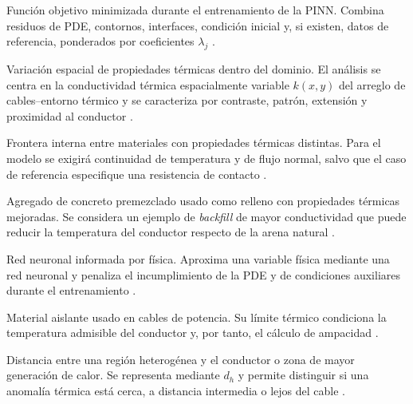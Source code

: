\documentclass[11pt,a4paper,oneside]{report}
\newcommand{\kx}{k(x,y)}
\begin{document}
\begin{description}[style=nextline,itemsep=0.5\baselineskip,parsep=0pt,topsep=0.25\baselineskip]
  \item[Función de pérdida.] Función objetivo minimizada durante el entrenamiento de la PINN. Combina residuos de PDE, contornos, interfaces, condición inicial y, si existen, datos de referencia, ponderados por coeficientes $\lambda_j$ \parencites[686--690]{raissi2019}[16]{pan2025}[1--2,17]{lawal2022}.

\item[Heterogeneidad térmica.] Variación espacial de propiedades térmicas dentro del dominio. El análisis se centra en la conductividad térmica espacialmente variable $\kx$ del arreglo de cables--entorno térmico y se caracteriza por contraste, patrón, extensión y proximidad al conductor \parencites{farouki1981thermal,devries1966thermal}[4--6]{enescu2021}[1,6--9]{khumalo2025}[1,10,16]{kim2025}.

  \item[Interfaz térmica.] Frontera interna entre materiales con propiedades térmicas distintas. Para el modelo se exigirá continuidad de temperatura y de flujo normal, salvo que el caso de referencia especifique una resistencia de contacto \parencites{carslaw1959conduction,kakac2018heatConduction,hahn2012heatConduction}{patankar1980numerical}[3]{xing2023}[3--4,93--99]{cigre2025}.

  \item[Material PAC.] Agregado de concreto premezclado usado como relleno con propiedades térmicas mejoradas. Se considera un ejemplo de \textit{backfill} de mayor conductividad que puede reducir la temperatura del conductor respecto de la arena natural \parencite[1,10,16]{kim2025}.

  \item[PINN.] Red neuronal informada por física. Aproxima una variable física mediante una red neuronal y penaliza el incumplimiento de la PDE y de condiciones auxiliares durante el entrenamiento \parencites[686--690]{raissi2019}[1--2,14--17]{lawal2022}[1,3,16]{pan2025}.

  \item[Polietileno reticulado o XLPE.] Material aislante usado en cables de potencia. Su límite térmico condiciona la temperatura admisible del conductor y, por tanto, el cálculo de ampacidad \parencites{iec60502_2_2014}[3--5]{enescu2020}[fig.~2]{kim2025}.

  \item[Proximidad de heterogeneidad.] Distancia entre una región heterogénea y el conductor o zona de mayor generación de calor. Se representa mediante $d_h$ y permite distinguir si una anomalía térmica está cerca, a distancia intermedia o lejos del cable \parencites[1,6--9]{khumalo2025}[1,10,16]{kim2025}[1--4]{oclon2015}.


\end{description}
\end{document}

